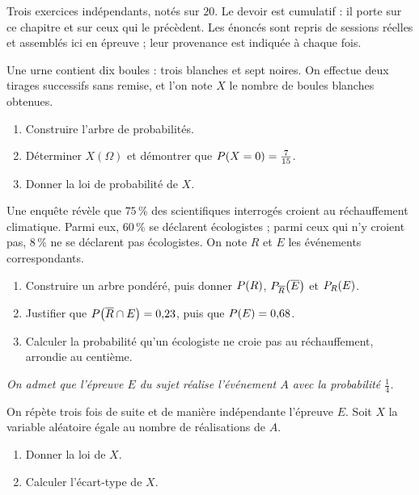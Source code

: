 \begin{devoir}[2 heures]
Trois exercices indépendants, notés sur $20$. Le devoir est cumulatif : il porte sur ce chapitre et sur ceux qui le précèdent. Les énoncés sont repris de sessions réelles et assemblés ici en épreuve ; leur provenance est indiquée à chaque fois.

Une urne contient dix boules : trois blanches et sept noires. On effectue deux
tirages successifs sans remise, et l'on note $X$ le nombre de boules blanches
obtenues.
\begin{enumerate}[label=\textbf{\alph*)}, leftmargin=*, itemsep=0.15em]
  \item Construire l'arbre de probabilités.
  \item Déterminer $X(\Omega)$ et démontrer que
        $\proba{X = 0} = \frac{7}{15}$.
  \item Donner la loi de probabilité de $X$.
\end{enumerate}

Une enquête révèle que $75\,\%$ des scientifiques interrogés croient au
réchauffement climatique. Parmi eux, $60\,\%$ se déclarent écologistes ; parmi
ceux qui n'y croient pas, $8\,\%$ ne se déclarent pas écologistes. On note $R$
et $E$ les événements correspondants.
\begin{enumerate}[label=\textbf{\alph*)}, leftmargin=*, itemsep=0.15em]
  \item Construire un arbre pondéré, puis donner $\proba{R}$,
        $\probacond{\evtc{E}}{\evtc{R}}$ et $\probacond{E}{R}$.
  \item Justifier que $\proba{\evtc{R} \cap E} = 0{,}23$, puis que
        $\proba{E} = 0{,}68$.
  \item Calculer la probabilité qu'un écologiste ne croie pas au
        réchauffement, arrondie au centième.
\end{enumerate}

\emph{On admet que l'épreuve $E$ du sujet réalise l'événement $A$ avec la
probabilité $\frac14$.}

On répète trois fois de suite et de manière indépendante l'épreuve $E$. Soit
$X$ la variable aléatoire égale au nombre de réalisations de $A$.
\begin{enumerate}[label=\textbf{\alph*)}, leftmargin=*, itemsep=0.15em]
  \item Donner la loi de $X$.
  \item Calculer l'écart-type de $X$.
\end{enumerate}

\end{devoir}

